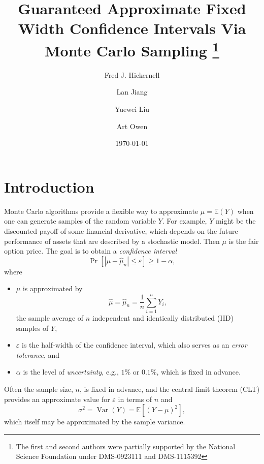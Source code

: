 \documentclass[graybox]{svmult}
\newcommand\e{\mathbb{E}}
\newcommand{\Prob}{\Pr}
\newcommand{\abs}[1]{\left|#1\right|}
\DeclareMathOperator{\var}{Var}
\newcommand{\hmu}{\hat{\mu}}
\def\abs#1{\ensuremath{\left \lvert #1 \right \rvert}}
\begin{document}
\date{\today}
\title*{Guaranteed Approximate Fixed Width Confidence Intervals Via Monte Carlo Sampling
\thanks{The first and second authors were partially supported by the National
Science Foundation under DMS-0923111 and DMS-1115392}}
\author{Fred J. Hickernell \and
Lan Jiang \and Yuewei Liu \and Art Owen }
%
%
\maketitle



\section{Introduction}

Monte Carlo algorithms provide a flexible way to approximate $\mu = \e(Y)$ when one can generate samples of the random variable $Y$. For example, $Y$ might be the discounted payoff of some financial derivative, which depends on the future performance of assets that are described by a stochastic model.  Then $\mu$ is the fair option price.  The goal is to obtain a \emph{confidence interval} 
\begin{equation} \label{confint}
\Prob[\abs{\mu - \hmu_n} \le \varepsilon] \ge 1-\alpha,
\end{equation}
where 
\begin{itemize}

\item $\mu$ is approximated by
\begin{equation} \label{eq:samplemean}
\hmu=\hmu_n = \frac 1n \sum_{i=1}^n Y_i,
\end{equation}
the sample average of $n$ independent and identically distributed (IID) samples of $Y$,

\item $\varepsilon$ is the half-width of the confidence interval, which also serves as an \emph{error tolerance}, and

\item $\alpha$ is the level of \emph{uncertainty}, e.g., $1\%$ or $0.1\%$, which is fixed in advance.

\end{itemize}
Often the sample size, $n$, is fixed in advance, and the central limit theorem (CLT) provides an approximate value for $\varepsilon$ in terms of $n$ and 
\begin{equation} \label{sigmadef}
\sigma^2=\var(Y)=\e[(Y-\mu)^2],
\end{equation}
which itself may be approximated by the sample variance.
\end{document}
